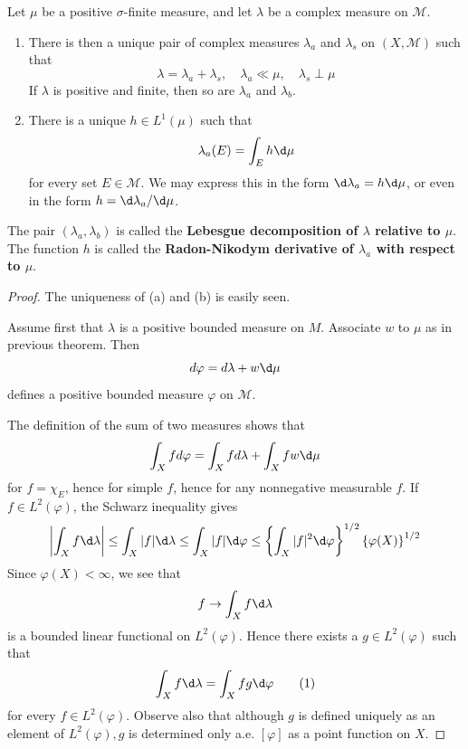 \documentclass[12pt, a4paper, oneside]{book}
\begin{document}
\begin{theorem}
    Let $\mu$ be a positive $\sigma$-finite measure, and let $\lambda$ be a complex measure on $\mathcal{M}$.
    \begin{enumerate}
        \item
              There is then a unique pair of complex measures $\lambda_{a}$ and $\lambda_s$ on $\left(X,\mathcal{M}\right)$ such that
              \begin{equation*}
                  \lambda=\lambda_a+\lambda_s, \quad \lambda_a \ll \mu, \quad \lambda_s \perp \mu
              \end{equation*}
              If $\lambda$ is positive and finite, then so are $\lambda_a$ and $\lambda_b$.

        \item
              There is a unique $h \in L^1(\mu)$ such that
              \begin{equation*}
                  \lambda_a(E)=\int_E h \d  \mu
              \end{equation*}
              for every set $E \in \mathcal{M}$. We may express this in the form $\d \lambda_{a}=h \d \mu$, or even in the form $h=\d \lambda_{a} / \d \mu$.
    \end{enumerate}

    \begin{remark}
        The pair $\left(\lambda_a, \lambda_b\right)$ is called the \textbf{Lebesgue decomposition of $\lambda$ relative to $\mu$}.
        The function $h$ is called the \textbf{Radon-Nikodym derivative of $\lambda_a$ with respect to $\mu$}.
    \end{remark}
    \begin{proof}
        The uniqueness of (a) and (b) is easily seen.

        Assume first that $\lambda$ is a positive bounded measure on $M$. Associate $w$ to $\mu$ as in previous theorem. Then
        $$
            d \varphi=d \lambda+w \d  \mu
        $$
        defines a positive bounded measure $\varphi$ on $\mathcal{M}$.

        The definition of the sum of two measures shows that
        $$
            \int_X f d \varphi=\int_X f d \lambda+\int_X f w \d  \mu
        $$
        for $f=\chi_E$, hence for simple $f$, hence for any nonnegative measurable $f$. If $f \in L^2(\varphi)$, the Schwarz inequality gives
        $$
            \left|\int_X f \d  \lambda\right| \leq \int_X|f| \d  \lambda \leq \int_X|f| \d  \varphi \leq\left\{\int_X |f|^2 \d  \varphi\right\}^{1 / 2}\left\{\varphi(X)\right\}^{1 / 2}
        $$
        Since $\varphi(X)<\infty$, we see that
        $$
            f \rightarrow \int_X f \d  \lambda
        $$
        is a bounded linear functional on $L^2(\varphi)$. Hence there exists a $g \in L^2(\varphi)$ such that
        \begin{equation}
            \int_X f \d  \lambda=\int_X f g \d  \varphi \tag{1}
        \end{equation}
        for every $f \in L^2(\varphi)$.
        Observe also that although $g$ is defined uniquely as an element of $L^2(\varphi), g$ is determined only a.e. $[\varphi]$ as a point function on $X$.


\end{proof}
\end{theorem}
\end{document}
